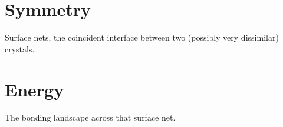 \section{Symmetry}
Surface nets, the coincident interface between two (possibly very dissimilar) crystals.

\section{Energy}
The bonding landscape across that surface net.